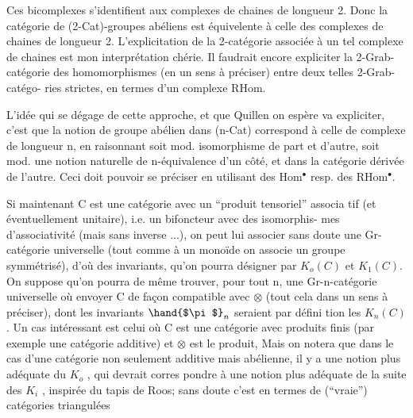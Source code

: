 Ces bicomplexes s'identifient aux complexes de chaines de longueur 2.
Donc la catégorie de (2-Cat)-groupes abéliens est équivelente à celle des
complexes de chaines de longueur 2. L'explicitation de la 2-catégorie
associée à un tel complexe de chaines est mon interprétation chérie. Il
faudrait encore expliciter la 2-Grab-catégorie des
homomorphismes (en un sens à préciser) entre deux telles 2-Grab-catégo-%
ries strictes, en termes d'un complexe RHom.

L'idée qui se dégage de cette approche, et que Quillen on espère va
expliciter, c'est que la  notion de groupe abélien
dans (n-Cat) correspond à celle de complexe de  longueur n, en raisonnant
soit mod. isomorphisme de part et d'autre, soit mod. une notion naturelle
de n-équivalence d'un côté, et dans la catégorie dérivée de l'autre. Ceci
doit pouvoir se préciser en utilisant des Hom$^{\bullet}$ resp. des RHom$^{\bullet}$.

Si maintenant C est une catégorie avec un ``produit tensoriel'' associa
tif (et éventuellement unitaire), i.e. un bifoncteur avec des isomorphis-%
mes d'associativité (mais sans inverse ...), on peut lui associer sans
doute une Gr-catégorie universelle (tout comme à un monoïde on associe un
groupe symmétrisé), d'où des invariants, qu'on pourra désigner par $K_o(C)$
et $K_1(C)$. On suppose qu'on pourra de même trouver, pour tout n, une
Gr-n-catégorie universelle où envoyer C de façon compatible avec $\otimes$ (tout
cela dans un sens à préciser), dont les invariants $\hand{$\pi$}_n$ seraient par défini
tion les $K_n(C)$. Un cas intéressant est celui où C est une catégorie avec
produits finis (par exemple une catégorie additive) et $\otimes$ est le produit,
 \over{(}{[}Mais on notera que dans le cas d'une catégorie non seulement additive
mais abélienne, il y a une notion plus adéquate du $K_o$ , qui devrait corres
pondre à une notion plus adéquate de la suite des $K_i$ , inspirée du tapis
de Roos; sans doute c'est en termes de (``vraie'') catégories triangulées

